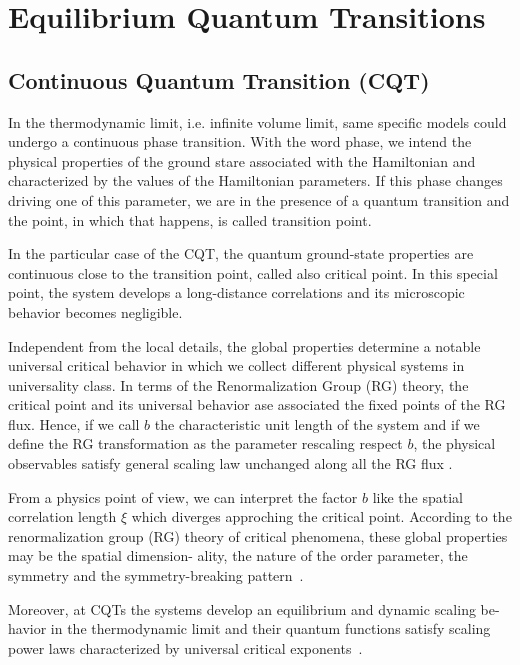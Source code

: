 \section{Equilibrium Quantum Transitions}

\subsection{Continuous Quantum Transition (CQT)}
\label{CQTeq}

In the thermodynamic limit, i.e. infinite volume limit, same specific models could undergo a continuous phase transition. With the word phase, we intend the physical properties of the ground stare associated with the Hamiltonian and characterized by the values of the Hamiltonian parameters. If this phase changes driving one of this parameter, we are in the presence of a quantum transition and the point, in which that happens, is called transition point.

In the particular case of the CQT, the quantum ground-state properties are continuous close to the transition point, called also critical point. 
In this special point, the system develops a long-distance correlations and its microscopic behavior becomes negligible.

Independent from the local details, the global properties determine a notable universal critical behavior in which we collect different physical systems in universality class.
In terms of the Renormalization Group (RG) theory, the critical point and its universal behavior ase associated the fixed points of the RG flux. Hence, if we call $b$ the characteristic unit length of the system and if we define the RG transformation as the parameter rescaling respect $b$, the physical observables satisfy general scaling law unchanged along all the RG flux \cite{S99, C-1996-ScalingandRG}.

From a physics point of view, we can interpret the factor $b$ like the spatial correlation length $\xi$ which diverges approching the critical point.
According to the renormalization group (RG)
theory of critical phenomena, these global properties may be the spatial dimension-
ality, the nature of the order parameter, the symmetry and the symmetry-breaking
pattern~\cite{PV2002}.

Moreover, at CQTs the systems develop an equilibrium and dynamic scaling be-
havior in the thermodynamic limit and their quantum functions satisfy scaling
power laws characterized by universal critical exponents~\cite{CV2014}.

